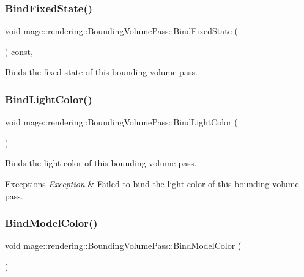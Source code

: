 \subsubsection{\texorpdfstring{Bind\+Fixed\+State()}{BindFixedState()}}
{\footnotesize\ttfamily void mage\+::rendering\+::\+Bounding\+Volume\+Pass\+::\+Bind\+Fixed\+State (\begin{DoxyParamCaption}{ }\end{DoxyParamCaption}) const\hspace{0.3cm}{\ttfamily [private]}, {\ttfamily [noexcept]}}

Binds the fixed state of this bounding volume pass. \mbox{\label{classmage_1_1rendering_1_1_bounding_volume_pass_a0bf1d814b3ebb56a6076bfb1cb27de8d}} 
\subsubsection{\texorpdfstring{Bind\+Light\+Color()}{BindLightColor()}}
{\footnotesize\ttfamily void mage\+::rendering\+::\+Bounding\+Volume\+Pass\+::\+Bind\+Light\+Color (\begin{DoxyParamCaption}{ }\end{DoxyParamCaption})\hspace{0.3cm}{\ttfamily [private]}}

Binds the light color of this bounding volume pass.


\begin{DoxyExceptions}{Exceptions}
{\em \mbox{\hyperlink{classmage_1_1_exception}{Exception}}} & Failed to bind the light color of this bounding volume pass. \\
\hline
\end{DoxyExceptions}
\mbox{\label{classmage_1_1rendering_1_1_bounding_volume_pass_a5b889af6dc3c58aecdd619dee69feca0}} 
\subsubsection{\texorpdfstring{Bind\+Model\+Color()}{BindModelColor()}}
{\footnotesize\ttfamily void mage\+::rendering\+::\+Bounding\+Volume\+Pass\+::\+Bind\+Model\+Color (\begin{DoxyParamCaption}{ }\end{DoxyParamCaption})\hspace{0.3cm}{\ttfamily [private]}}

